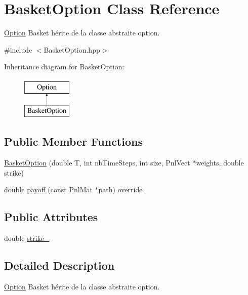 \hypertarget{classBasketOption}{\section{Basket\-Option Class Reference}
\label{classBasketOption}
}


\hyperlink{classOption}{Option} Basket hérite de la classe abstraite option.  




{\ttfamily \#include $<$Basket\-Option.\-hpp$>$}

Inheritance diagram for Basket\-Option\-:\begin{figure}[H]
\begin{center}
\leavevmode
\includegraphics[height=2.000000cm]{classBasketOption}
\end{center}
\end{figure}
\subsection*{Public Member Functions}
\begin{DoxyCompactItemize}
\item 
\hyperlink{classBasketOption_a1842966514887a4e9086ec5ffb176558}{Basket\-Option} (double T, int nb\-Time\-Steps, int size, Pnl\-Vect $\ast$weights, double strike)
\item 
double \hyperlink{classBasketOption_a57c941403d2bd21159b090fa6481ee9e}{payoff} (const Pnl\-Mat $\ast$path) override
\end{DoxyCompactItemize}
\subsection*{Public Attributes}
\begin{DoxyCompactItemize}
\item 
double \hyperlink{classBasketOption_abf96256c30b8e0d063611b11972d32c5}{strike\-\_\-}
\end{DoxyCompactItemize}


\subsection{Detailed Description}
\hyperlink{classOption}{Option} Basket hérite de la classe abstraite option. 

